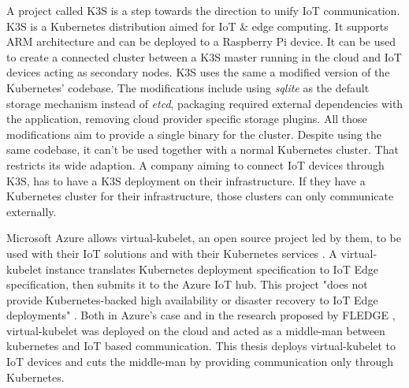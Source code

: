A project called K3S \cite{k3s} is a step towards the direction to unify IoT communication. K3S is a Kubernetes distribution aimed for IoT \& edge computing. It supports ARM architecture and can be deployed to a Raspberry Pi device. It can be used to create a connected cluster between a K3S master running in the cloud and IoT devices acting as secondary nodes. K3S uses the same a modified version of the Kubernetes' codebase. The modifications include using \textit{sqlite} as the default storage mechanism instead of \textit{etcd}, packaging required external dependencies with the application, removing cloud provider specific storage plugins. All those modifications aim to provide a single binary for the cluster. Despite using the same codebase, it can't be used together with a normal Kubernetes cluster. That restricts its wide adaption. A company aiming to connect IoT devices through K3S, has to have a K3S deployment on their infrastructure. If they have a Kubernetes cluster for their infrastructure, those clusters can only communicate externally.

Microsoft Azure allows virtual-kubelet, an open source project led by them, to be used with their IoT solutions and with their Kubernetes services \cite{Chandra2019}. A virtual-kubelet instance translates Kubernetes deployment specification to IoT Edge specification, then submits it to the Azure IoT hub. This project "does not provide Kubernetes-backed high availability or disaster recovery to IoT Edge deployments" \cite{azure-vk-github}. Both in Azure's case and in the research proposed by FLEDGE \cite{fledge}, virtual-kubelet was deployed on the cloud and acted as a middle-man between kubernetes and IoT based communication. This thesis deploys virtual-kubelet to IoT devices and cuts the middle-man by providing communication only through Kubernetes.